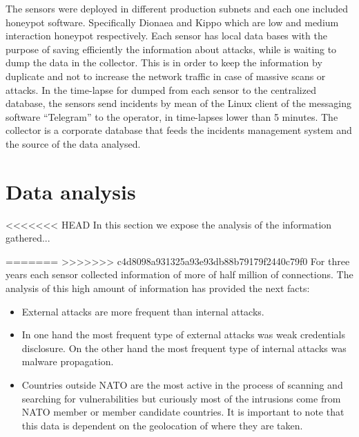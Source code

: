 \documentclass[a4paper]{llncs}
\begin{document}
The sensors were deployed in different production subnets and each one included honeypot software. Specifically Dionaea\cite{dionaea} and Kippo\cite{kippo} which are low and medium interaction honeypot respectively. Each sensor has local data bases with the purpose of saving efficiently the information about attacks, while is waiting to dump the data in the collector. This is  in order to keep the information by duplicate and not to increase the network traffic in case of massive scans or attacks. In the time-lapse for dumped from each sensor to the centralized database, the sensors send incidents by mean of the Linux client of the messaging software ``Telegram'' to the operator, in time-lapses lower than 5 minutes. The collector is a corporate database that feeds the incidents management system and the source of the data analysed.
	
	
\section{Data analysis}
\label{sec:analysis}
<<<<<<< HEAD
In this section we expose the analysis of the information gathered...

=======
>>>>>>> c4d8098a931325a93e93db88b79179f2440c79f0
For three years each sensor collected information of more of half million of connections. The analysis of this high amount of information has provided the next facts:
\begin{itemize}
	\item External attacks are more frequent than internal attacks.
	\item In one hand the most frequent type of external attacks was weak credentials disclosure. On the other hand the most frequent type of internal attacks was malware propagation.
	\item Countries outside NATO are the most active in the process of scanning and searching for vulnerabilities but curiously most of the intrusions come from NATO member or member candidate countries. It is important to note that this data is dependent on the geolocation of where they are taken.
\end{itemize}
	
\end{document}
